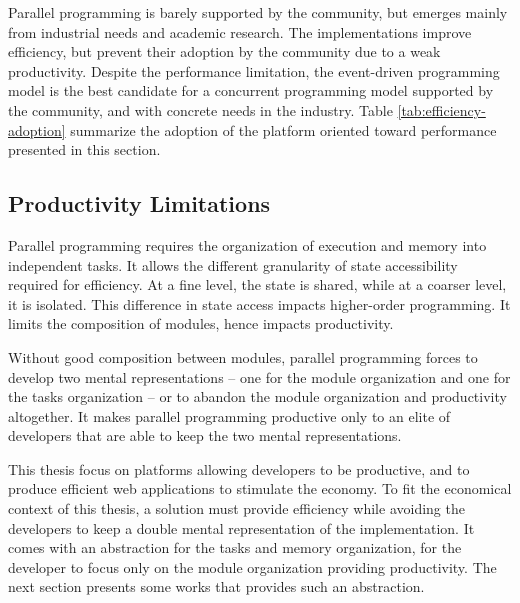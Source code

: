 Parallel programming is barely supported by the community, but emerges mainly from industrial needs and academic research.
The implementations improve efficiency, but prevent their adoption by the community due to a weak productivity.
Despite the performance limitation, the event-driven programming model is the best candidate for a concurrent programming model supported by the community, and with concrete needs in the industry.
Table \ref{tab:efficiency-adoption} summarize the adoption of the platform oriented toward performance presented in this section.


\subsection{Productivity Limitations} \label{chapter3:software-efficiency:productivity-limitations}

Parallel programming requires the organization of execution and memory into independent tasks.
It allows the different granularity of state accessibility required for efficiency.
At a fine level, the state is shared, while at a coarser level, it is isolated.
This difference in state access impacts higher-order programming.
It limits the composition of modules, hence impacts productivity.

Without good composition between modules, parallel programming forces to develop two mental representations -- one for the module organization and one for the tasks organization -- or to abandon the module organization and productivity altogether.
It makes parallel programming productive only to an elite of developers that are able to keep the two mental representations.

This thesis focus on platforms allowing developers to be productive, and to produce efficient web applications to stimulate the economy.
To fit the economical context of this thesis, a solution must provide efficiency while avoiding the developers to keep a double mental representation of the implementation.
It comes with an abstraction for the tasks and memory organization, for the developer to focus only on the module organization providing productivity.
The next section presents some works that provides such an abstraction.

